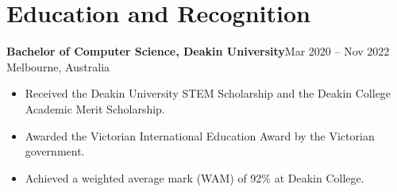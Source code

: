 \documentclass[11pt,a4paper]{article}
\begin{document}
\section{Education and Recognition}
\textbf{Bachelor of Computer Science, Deakin University}\hfill Mar 2020 -- Nov 2022\\
Melbourne, Australia
\begin{itemize}
\item Received the Deakin University STEM Scholarship and the Deakin College Academic Merit Scholarship.
\item Awarded the Victorian International Education Award by the Victorian government.
\item Achieved a weighted average mark (WAM) of 92\% at Deakin College.
\end{itemize}
\end{document}
